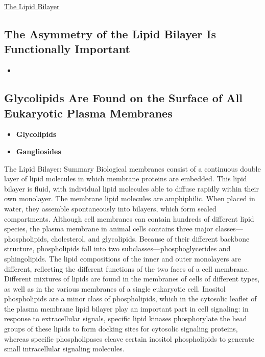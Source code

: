 \documentclass[12pt,letterpaper]{article}
\begin{document}
\begin{secbox}{\hyperlink{10}{The Lipid Bilayer}}
{    \subsection*{The Asymmetry of the Lipid Bilayer Is Functionally Important}
    \begin{itemize}
        \item 
    \end{itemize}
    
    \subsection*{Glycolipids Are Found on the Surface of All Eukaryotic Plasma Membranes}
    \begin{itemize}
        \item \textbf{Glycolipids}
        \item \textbf{Gangliosides}
    \end{itemize}

    \begin{probbox}{The Lipid Bilayer: Summary}
        Biological membranes consist of a continuous double layer of lipid molecules in which membrane proteins are embedded. This lipid bilayer is fluid, with individual lipid molecules able to diffuse rapidly within their own monolayer. The membrane lipid molecules are amphiphilic. When placed in water, they assemble spontaneously into bilayers, which form sealed compartments. Although cell membranes can contain hundreds of different lipid species, the plasma membrane in animal cells contains three major classes—phospholipids, cholesterol, and glycolipids. Because of their different backbone structure, phospholipids fall into two subclasses—phosphoglycerides and sphingolipids. The lipid compositions of the inner and outer monolayers are different, reflecting the different functions of the two faces of a cell membrane. Different mixtures of lipids are found in the membranes of cells of different types, as well as in the various membranes of a single eukaryotic cell. Inositol phospholipids are a minor class of phospholipids, which in the cytosolic leaflet of the plasma membrane lipid bilayer play an important part in cell signaling: in response to extracellular signals, specific lipid kinases phosphorylate the head groups of these lipids to form docking sites for cytosolic signaling proteins, whereas specific phospholipases cleave certain inositol phospholipids to generate small intracellular signaling molecules.
    \end{probbox}
}\end{secbox}
\end{document}

